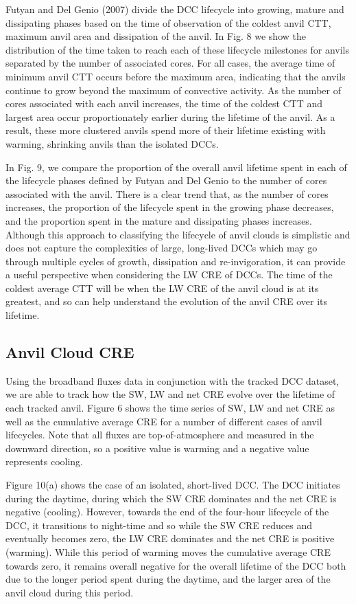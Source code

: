 Futyan and Del Genio (2007) divide the DCC lifecycle into growing,
mature and dissipating phases based on the time of observation of the
coldest anvil CTT, maximum anvil area and dissipation of the anvil. In
Fig. 8 we show the distribution of the time taken to reach each of these
lifecycle milestones for anvils separated by the number of associated
cores. For all cases, the average time of minimum anvil CTT occurs
before the maximum area, indicating that the anvils continue to grow
beyond the maximum of convective activity. As the number of cores
associated with each anvil increases, the time of the coldest CTT and
largest area occur proportionately earlier during the lifetime of the
anvil. As a result, these more clustered anvils spend more of their
lifetime existing with warming, shrinking anvils than the isolated DCCs.

In Fig. 9, we compare the proportion of the overall anvil lifetime spent
in each of the lifecycle phases defined by Futyan and Del Genio to the
number of cores associated with the anvil. There is a clear trend that,
as the number of cores increases, the proportion of the lifecycle spent
in the growing phase decreases, and the proportion spent in the mature
and dissipating phases increases. Although this approach to classifying
the lifecycle of anvil clouds is simplistic and does not capture the
complexities of large, long-lived DCCs which may go through multiple
cycles of growth, dissipation and re-invigoration, it can provide a
useful perspective when considering the LW CRE of DCCs. The time of the
coldest average CTT will be when the LW CRE of the anvil cloud is at its
greatest, and so can help understand the evolution of the anvil CRE over
its lifetime.

\subsection{Anvil Cloud CRE}

Using the broadband fluxes data in conjunction with the tracked DCC
dataset, we are able to track how the SW, LW and net CRE evolve over the
lifetime of each tracked anvil. Figure 6 shows the time series of SW, LW
and net CRE as well as the cumulative average CRE for a number of
different cases of anvil lifecycles. Note that all fluxes are
top-of-atmosphere and measured in the downward direction, so a positive
value is warming and a negative value represents cooling.

Figure 10(a) shows the case of an isolated, short-lived DCC. The DCC
initiates during the daytime, during which the SW CRE dominates and the
net CRE is negative (cooling). However, towards the end of the four-hour
lifecycle of the DCC, it transitions to night-time and so while the SW
CRE reduces and eventually becomes zero, the LW CRE dominates and the
net CRE is positive (warming). While this period of warming moves the
cumulative average CRE towards zero, it remains overall negative for the
overall lifetime of the DCC both due to the longer period spent during
the daytime, and the larger area of the anvil cloud during this period.

